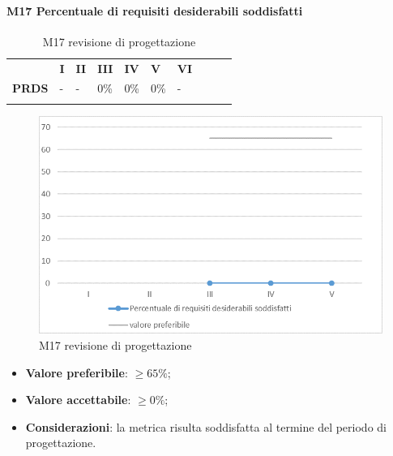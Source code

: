 \paragraph{M17 Percentuale di requisiti desiderabili soddisfatti} \mbox{}
\begin{longtable}[H!] {						
		>{}p{50mm}  		
		>{}p{8mm}
		>{}p{8mm}		
		>{}p{8mm}		
		>{}p{8mm}		
		>{}p{8mm}		
		>{}p{8mm}
		>{}p{8mm}
		>{}p{8mm}
		>{}p{8mm}
	}
	\rowcolor{gray!50}
	\textbf{} & \textbf{I} & \textbf{II} & \textbf{III} & \textbf{IV} & \textbf{V} & \textbf{VI} \TBstrut \\ [2mm]
	\textbf{PRDS} & - & - & 0\% & 0\% & 0\% & - \TBstrut \\ [2mm]
	\rowcolor{white}
	\caption{M17 revisione di progettazione}
\end{longtable}
\begin{figure}[H] 	
\includegraphics[width=\linewidth]{./img/grafici/RP14.png}	
\caption{M17 revisione di progettazione}	
\end{figure}
\begin{itemize}
	\item \textbf{Valore preferibile}: $\ge 65\%$;
	\item \textbf{Valore accettabile}: $\ge 0\%$;
	\item \textbf{Considerazioni}: la metrica risulta soddisfatta al termine del periodo di progettazione.
\end{itemize}

